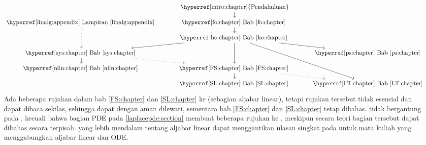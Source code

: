 \begin{equation*}
\begin{tikzcd}[cramped, row sep=small]
& {\text{\hyperref[intro:chapter]{Pendahuluan}}} \arrow[d] \\
{\text{\Appendixref{linalg:appendix}}} \arrow[dd, dotted]
& {\text{\Chapterref{fo:chapter}}} \arrow[d] \\
& {\text{\Chapterref{ho:chapter}}} \arrow[dddr] \arrow[dd] \arrow[dl] \arrow[dr] \\
{\text{\Chapterref{sys:chapter}}} \arrow[dr, dotted] \arrow[d] & &
  {\text{\Chapterref{ps:chapter}}} \\
{\text{\Chapterref{nlin:chapter}}} & {\text{\Chapterref{FS:chapter}}} \arrow[d]
\arrow[dr,dotted] \\
& {\text{\Chapterref{SL:chapter}}}
& {\text{\Chapterref{LT:chapter}}}
\end{tikzcd}
\end{equation*}

Ada beberapa rujukan dalam bab \ref{FS:chapter} dan \ref{SL:chapter}
ke  (sebagian aljabar linear), tetapi rujukan tersebut
tidak esensial dan dapat dibaca sekilas,
sehingga 
dapat dengan aman dilewati, sementara
bab \ref{FS:chapter} dan \ref{SL:chapter} tetap dibahas.
 tidak bergantung pada
, kecuali bahwa
bagian PDE pada \ref{laplacepde:section} membuat
beberapa rujukan ke
,
meskipun secara teori bagian tersebut dapat dibahas
secara terpisah.
 yang lebih mendalam tentang aljabar linear
dapat menggantikan ulasan singkat pada 
untuk mata kuliah yang menggabungkan aljabar linear dan ODE.

